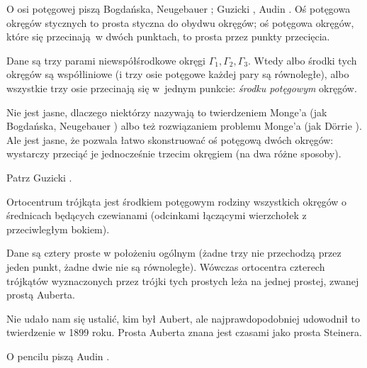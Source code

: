 O osi potęgowej piszą Bogdańska, Neugebauer \cite[s. 69]{neugebauer_2018}; Guzicki \cite[s. 173, 174]{guzicki_2021}, Audin \cite[s. 89]{audin_2003}.
Oś potęgowa okręgów stycznych to prosta styczna do obydwu okręgów; oś potęgowa okręgów, które się przecinają w dwóch punktach, to prosta przez punkty przecięcia.

\begin{proposition}
	Dane są trzy parami niewspółśrodkowe okręgi $\Gamma_1, \Gamma_2, \Gamma_3$.
	Wtedy albo środki tych okręgów są współliniowe (i trzy osie potęgowe każdej pary są równoległe), albo wszystkie trzy osie przecinają się w~jednym punkcie: \emph{środku potęgowym} okręgów.
\end{proposition}

Nie jest jasne, dlaczego niektórzy nazywają to twierdzeniem Monge'a (jak Bogdańska, Neugebauer \cite[s. ???]{neugebauer_2018}) albo też rozwiązaniem problemu Monge'a (jak Dörrie \cite[s. 151]{dorrie_1965}).
%
Ale jest jasne, że pozwala łatwo skonstruować oś potęgową dwóch okręgów: wystarczy przeciąć je jednocześnie trzecim okręgiem (na dwa różne sposoby).

Patrz Guzicki \cite[s. 174]{guzicki_2021}.

\begin{proposition}
	Ortocentrum trójkąta jest środkiem potęgowym rodziny wszystkich okręgów o średnicach będących czewianami (odcinkami łączącymi wierzchołek z przeciwległym bokiem).
\end{proposition}

\begin{theorem}[Auberta]
	Dane są cztery proste w położeniu ogólnym (żadne trzy nie przechodzą przez jeden punkt, żadne dwie nie są równoległe).
	Wówczas ortocentra czterech trójkątów wyznaczonych przez trójki tych prostych leża na jednej prostej, zwanej prostą Auberta.
\end{theorem}

Nie udało nam się ustalić, kim był Aubert, ale najprawdopodobniej udowodnił to twierdzenie w 1899 roku.
Prosta Auberta znana jest czasami jako prosta Steinera.

O pencilu piszą Audin \cite[s. 92-98]{audin_2003}.